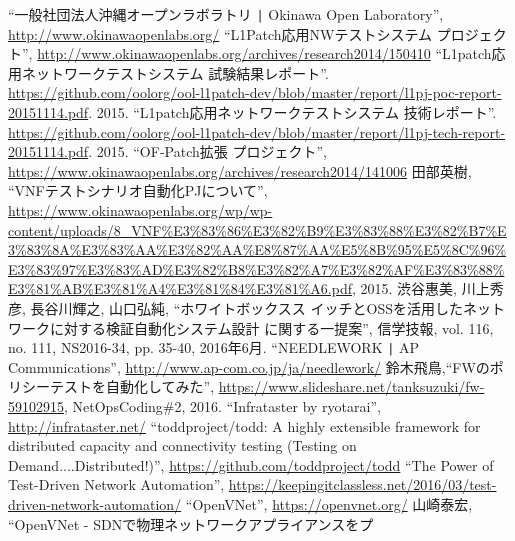 
\begin{thebibliography}{99}
         ``一般社団法人沖縄オープンラボラトリ \verb+|+ Okinawa Open Laboratory'',
         \url{http://www.okinawaopenlabs.org/}
         ``L1Patch応用NWテストシステム プロジェクト'',
         \url{http://www.okinawaopenlabs.org/archives/research2014/150410}
         ``L1patch応用ネットワークテストシステム 試験結果レポート''.
         \url{https://github.com/oolorg/ool-l1patch-dev/blob/master/report/l1pj-poc-report-20151114.pdf}.
         2015.
         ``L1patch応用ネットワークテストシステム 技術レポート''.
         \url{https://github.com/oolorg/ool-l1patch-dev/blob/master/report/l1pj-tech-report-20151114.pdf}.
         2015.
         ``OF-Patch拡張 プロジェクト'',
         \url{https://www.okinawaopenlabs.org/archives/research2014/141006}
         田部英樹, ``VNFテストシナリオ自動化PJについて'',
         \url{https://www.okinawaopenlabs.org/wp/wp-content/uploads/8_VNF%E3%83%86%E3%82%B9%E3%83%88%E3%82%B7%E3%83%8A%E3%83%AA%E3%82%AA%E8%87%AA%E5%8B%95%E5%8C%96%E3%83%97%E3%83%AD%E3%82%B8%E3%82%A7%E3%82%AF%E3%83%88%E3%81%AB%E3%81%A4%E3%81%84%E3%81%A6.pdf}, 2015.
         渋谷惠美, 川上秀彦, 長谷川輝之, 山口弘純, ``ホワイトボックスス
         イッチとOSSを活用したネットワークに対する検証自動化システム設計
         に関する一提案'', 信学技報, vol. 116, no. 111, NS2016-34,
         pp. 35-40, 2016年6月.
         ``NEEDLEWORK \verb+|+ AP Communications'',
         \url{http://www.ap-com.co.jp/ja/needlework/}
         鈴木飛鳥,``FWのポリシーテストを自動化してみた'',
         \url{https://www.slideshare.net/tanksuzuki/fw-59102915},
         NetOpsCoding\#2, 2016.
         ``Infrataster by ryotarai'',
         \url{http://infrataster.net/}
         ``toddproject/todd: A highly extensible framework for distributed capacity and connectivity testing (Testing on Demand....Distributed!)'',
         \url{https://github.com/toddproject/todd}
         ``The Power of Test-Driven Network Automation'',
         \url{https://keepingitclassless.net/2016/03/test-driven-network-automation/}
         ``OpenVNet'', \url{https://openvnet.org/}
         山崎泰宏, ``OpenVNet - SDNで物理ネットワークアプライアンスをプ

\end{thebibliography}
